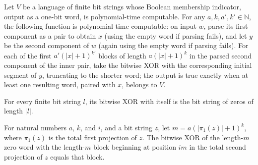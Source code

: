 \begin{theorem}
\label{Complexity.polyTimeComputable_blockXorAnyTest}
\leanok
{}
Let $V$ be a language of finite bit strings whose Boolean membership indicator, output
as a one-bit word, is polynomial-time computable. For any $a,k,a',k'\in\mathbb{N}$, the
following function is polynomial-time computable: on input $w$, parse its first
component as a pair to obtain $x$ (using the empty word if parsing fails), and let $y$
be the second component of $w$ (again using the empty word if parsing fails). For each
of the first $a'(|x|+1)^{k'}$ blocks of length $a(|x|+1)^k$ in the parsed second
component of the inner pair, take the bitwise XOR with the corresponding initial segment
of $y$, truncating to the shorter word; the output is true exactly when at least one
resulting word, paired with $x$, belongs to $V$.
\end{theorem}

\begin{theorem}
\label{Complexity.zipWith_xor_self}
\leanok
{}
For every finite bit string $l$, its bitwise XOR with itself is the bit string of zeros
of length $|l|$.
\end{theorem}

\begin{theorem}
\label{Complexity.zipWith_xor_blockAt}
\leanok
{}
For natural numbers $a$, $k$, and $i$, and a bit string $z$, let $m=a(|\pi_1(z)|+1)^k$,
where $\pi_1(z)$ is the total first projection of $z$. The bitwise XOR of the length-$m$
zero word with the length-$m$ block beginning at position $im$ in the total second
projection of $z$ equals that block.
\end{theorem}


